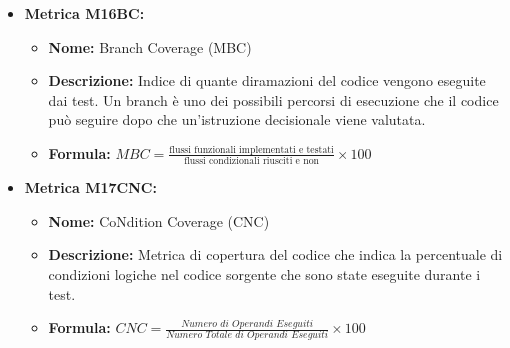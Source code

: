 \begin{itemize}
          \item \textbf{Metrica M16BC:}
          \begin{itemize}
              \item \textbf{Nome:} Branch Coverage (MBC)
              \item \textbf{Descrizione:} Indice di quante diramazioni del codice vengono eseguite dai test. Un branch è uno dei possibili percorsi di esecuzione che il codice può seguire dopo che un'istruzione decisionale viene valutata.
              \item \textbf{Formula:} $MBC = \frac{\text{flussi funzionali implementati e testati}}{\text{flussi condizionali riusciti e non}} \times 100$
          \end{itemize}

          \item \textbf{Metrica M17CNC:}
          \begin{itemize}
              \item \textbf{Nome:} CoNdition Coverage (CNC)
              \item \textbf{Descrizione:} Metrica di copertura del codice che indica la percentuale di condizioni logiche nel codice sorgente che sono state eseguite durante i test.
              \item \textbf{Formula:} $CNC = \frac{\textit{Numero di Operandi Eseguiti}}{\textit{Numero Totale di Operandi Eseguiti}} \times 100$
          \end{itemize}
\end{itemize}

